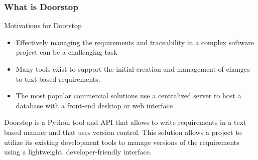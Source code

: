 \documentclass[aspectratio=169]{beamer}
\begin{document}
\begin{frame}
  \frametitle{What is Doorstop}
  \begin{block}{Motivations for Doorstop}
  \begin{itemize}
    \item Effectively managing the requirements and traceability in a complex software project can be a
challenging task
    \item Many tools exist to support the initial creation and management of changes to
text-based requirements.
    \item The most popular commercial solutions use a centralized server to host
a database with a front-end desktop or web interface
  \end{itemize}
  
  \end{block}

  Doorstop is a Python tool and API that allows to write requirements in a text based manner and that uses version control. This solution allows a project to utilize its existing development tools to manage versions of the requirements using a lightweight, developer-friendly interface.  
\end{frame}
\end{document}
